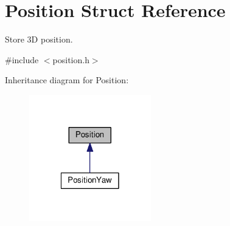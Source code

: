 \hypertarget{structPosition}{\section{Position Struct Reference}
\label{structPosition}
}


Store 3\-D position.  




{\ttfamily \#include $<$position.\-h$>$}



Inheritance diagram for Position\-:\nopagebreak
\begin{figure}[H]
\begin{center}
\leavevmode
\includegraphics[width=150pt]{structPosition__inherit__graph}
\end{center}
\end{figure}
